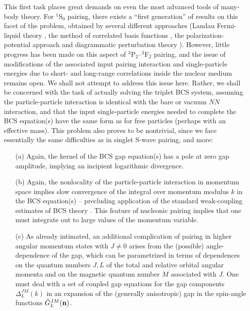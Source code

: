 This first task places great demands on even the most advanced tools
of many-body theory.  For $^1$S$_0$ pairing, there exists a ``first 
generation'' of results on this facet of the problem, obtained by 
several different approaches (Landau Fermi-liquid theory \cite{kallman},
the method of correlated basis functions \cite{chen,ccdk}, the
polarization-potential approach \cite{pines,wambach} and diagrammatic 
perturbation theory \cite{schulze2}).  However, little progress has been 
made on this aspect of $^3$P$_2$--$^3$F$_2$ pairing, and the issue of 
modifications of the associated input pairing interaction and 
single-particle energies due to short- and long-range correlations 
inside the nuclear medium remains open.  We shall not attempt to address
this issue here.  Rather, we shall be concerned with the task
of actually solving the triplet BCS system, assuming the particle-particle
interaction is identical with the bare or vacuum $NN$ interaction,
and that the input single-particle energies needed to complete
the BCS equation(s) have the same form as for free particles
(perhaps with an effective mass).  This problem also proves to
be nontrivial, since we face essentially the same difficulties
as in singlet S-wave pairing, and more:  
\begin{enumerate}
\item[(a)]
Again, the kernel of the BCS gap equation(s) has a pole at zero gap 
amplitude, implying an incipient logarithmic divergence.  
\item[(b)]
Again, the nonlocality of the particle-particle interaction in momentum space 
implies slow convergence of the integral over momentum modulus $k$ in the 
BCS equation(s) -- precluding application of the standard weak-coupling
estimates of BCS theory \cite{schrieffer}.  This feature of nucleonic 
pairing implies that one must integrate out to large values of the 
momentum variable.
\item[(c)] 
As already intimated, an additional complication of pairing in 
higher angular momentum states with $J\neq 0$ arises from
the (possible) angle-dependence of the gap, which can be
parametrized in terms of dependences on the quantum numbers
$J,L$ of the total and relative orbital angular momenta and
on the magnetic quantum number $M$ associated with $J$.  One 
must deal with a set of coupled gap equations for the gap components 
$\Delta_L^{JM}(k)$ in an expansion of the (generally anisotropic) 
gap in the spin-angle functions ${\hat G}_L^{JM}({\bf n})$.  
\end{enumerate}

